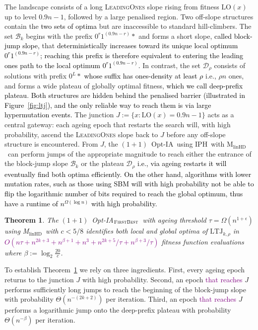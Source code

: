 \documentclass[lettersize,journal]{IEEEtran}
\newcommand{\new}[1]{\textcolor{black}{#1}}
\newcommand{\rerev}[1]{\textcolor{purple}{#1}}
\newcommand{\rev}[1]{\textcolor{black}{#1}}
\newcommand{\oneoneOPTIA}{$(1+1)$~Opt-IA}
\newcommand{\linHD}{M$_{\text{linHD}}$}
\newcommand{\IPHfcm}{IPH}
\newtheorem{theorem}{Theorem}
\begin{document}
The landscape consists of a long \textsc{LeadingOnes} slope rising from fitness 
$\mathrm{LO}(x)$ up to level $0.9n-1$, followed by a large penalised region.  
Two off-slope structures contain the \textcolor{black}{two sets of optima} but are inaccessible to 
standard hill-climbers.  
The set $\mathcal{B}_k$ begins with the prefix $0^{r}1^{(0.9n-r)} *$ and forms a 
short slope, \new{called block-jump slope,} that \textcolor{black}{deterministically increases toward its unique local optimum 
\textcolor{black}{$0^{r}1^{(0.9n-r)}$}; reaching 
this prefix is therefore equivalent to entering the leading ones path to the local optimum \textcolor{black}{
$0^{r}1^{(0.9n-r)}$}.}  
In contrast, the set $\mathcal{D}_\rho$ consists of solutions with prefix 
$0^{L} *$ \textcolor{black}{whose suffix has ones-density at least $\rho$} i.e., $\rho n$ ones, and forms a wide 
plateau of globally optimal fitness, \new{which we call  deep-prefix plateau}.  
\textcolor{black}{Both structures are hidden behind the penalised barrier (illustrated in
Figure~\ref{fig:ltj}), and the only reliable way to reach them is via large
hypermutation events.}  
The junction $J := \{x : \mathrm{LO}(x)=0.9n-1\}$ acts as a central gateway: 
each ageing epoch that restarts the search will, with high probability, ascend 
the \textsc{LeadingOnes} slope back to $J$ before any off-slope structure is encountered.  
From $J$, the \oneoneOPTIA~using \IPHfcm{}~with \linHD~can perform jumps of the 
appropriate magnitude to reach either the entrance of the block-jump slope $\mathcal{B}_k$ or 
the plateau $\mathcal{D}_\rho$ \rev{i.e., via ageing restarts it will eventually find both optima efficiently.} 
\textcolor{black}{On the other hand, algorithms with lower mutation rates, such as those using SBM will with high probability not be able to flip the logarithmic number of bits required to reach the global optimum, thus have a runtime of $n^{\Omega(\log n)}$ with high probability.}

\begin{theorem} \label{thm:main-tau-final}
The  $(1+1)$~Opt-IA$_{\textsc{FirstBest}}$~with ageing threshold $\tau=\Omega(n^{1+\epsilon})$ using  \linHD~with $c<5/8$  identifies both local and global optima of  $\mathrm{LTJ}_{k,\rho}$ in
	\rerev{$O(n\tau + n^{2k+3} + n^{\beta+1} + n^3 + n^{2k+5}/\tau + n^{\beta+3}/\tau)$} fitness function evaluations	where $\beta := \log_2 \frac{20}{c}$.
\end{theorem}

To establish Theorem~\ref{thm:main-tau-final} we rely on three ingredients.
First, every ageing epoch returns to the junction $J$ with high probability.
Second, an epoch \rerev{that reaches} $J$ performs sufficiently long jumps to reach the beginning of the block-jump slope with probability $\Theta(n^{-(2k+2)})$ per iteration.
Third, an epoch \rerev{that reaches} $J$ performs a logarithmic jump onto the deep-prefix plateau with probability $\Theta(n^{-\beta})$ per iteration.
\end{document}

